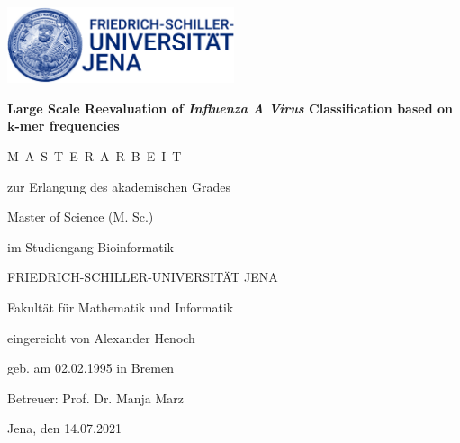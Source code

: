 \begin{titlepage}
    
    \centering 
    \large
    \includegraphics[width=0.5\textwidth]{Graphics/Logo.jpg}

    \vspace{5em}

    {\Large \textbf{Large Scale Reevaluation of \textit{Influenza A Virus} Classification based on $\bm{k}$-mer frequencies}}
    
    \vspace{5em}
    
    M~A~S~T~E~R~A~R~B~E~I~T
    
    \vspace{1em}
    
    zur Erlangung des akademischen Grades
    
    \vspace{1em}
    
    Master of Science (M. Sc.)
    
    im Studiengang Bioinformatik
    
    \vspace{1em}
    
    FRIEDRICH-SCHILLER-UNIVERSITÄT JENA
    
    Fakultät für Mathematik und Informatik
    
    \vfill
    
    eingereicht von Alexander Henoch
    
    geb. am 02.02.1995 in Bremen
    
    \vspace{1em}
    
    Betreuer: Prof. Dr. Manja Marz
    
    \vspace{1em}
    
    Jena, den 14.07.2021
    
\end{titlepage}